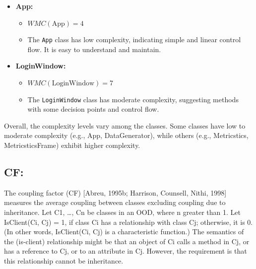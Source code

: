 {{{{\begin{itemize}
    \item \textbf{App:}
    \begin{itemize}
        \item $WMC(\text{App}) = 4$
        \item The \texttt{App} class has low complexity, indicating simple and linear control flow. It is easy to understand and maintain.
    \end{itemize}
    
    \item \textbf{LoginWindow:}
    \begin{itemize}
        \item $WMC(\text{LoginWindow}) = 7$
        \item The \texttt{LoginWindow} class has moderate complexity, suggesting methods with some decision points and control flow.
    \end{itemize}
\end{itemize}

Overall, the complexity levels vary among the classes. Some classes have low to moderate complexity (e.g., App, DataGenerator), while others (e.g., Metricstics, MetricsticsFrame) exhibit higher complexity.


\subsection{CF: }
The coupling factor (CF) [Abreu, 1995b; Harrison, Counsell, Nithi, 1998] measures the
average coupling between classes excluding coupling due to inheritance.\newline
Let C1, …, Cn be classes in an OOD, where n greater than 1.
Let IsClient(Ci, Cj) = 1, if class Ci has a relationship with class Cj; otherwise, it is 0. (In
other words, IsClient(Ci, Cj) is a characteristic function.)\newline
The semantics of the (is-client) relationship might be that an object of Ci calls a method
in Cj, or has a reference to Cj, or to an attribute in Cj. However, the requirement is that
this relationship cannot be inheritance. 

}}}}
